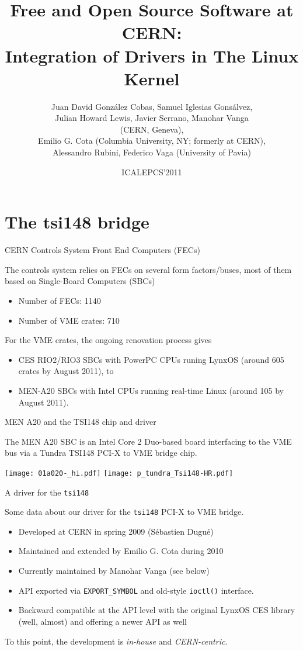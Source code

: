 \documentclass{beamer}
\title[FOSS at CERN: Drivers in the Kernel]%
	{Free and Open Source Software at CERN:\\
	Integration of Drivers in The Linux Kernel}
\author[David Cobas et al.]{%
	Juan David Gonz\'alez Cobas, Samuel Iglesias Gons\'alvez,\\
	Julian Howard Lewis, Javier Serrano, Manohar Vanga\\
		(CERN, Geneva),\\
	Emilio G. Cota (Columbia University, NY; formerly at CERN),\\
	Alessandro Rubini, Federico Vaga (University of Pavia)}
\date{ICALEPCS'2011}
\begin{document}
\begin{frame}
\titlepage
\end{frame}

\section{The tsi148 bridge}
\begin{frame}{CERN Controls System Front End Computers (FECs)}

The controls system relies on FECs on several form factors/buses,
most of them based on Single-Board Computers (SBCs)

\begin{itemize}
\item Number of FECs: 1140
\item Number of VME crates: 710
\end{itemize}

For the VME crates, the ongoing renovation process gives
\begin{itemize}
\item CES RIO2/RIO3 SBCs with PowerPC CPUs runing
LynxOS (around 605 crates by August 2011), to
\item MEN-A20 SBCs with Intel CPUs running real-time
Linux (around 105 by August 2011).
\end{itemize}
\end{frame}


\begin{frame}{MEN A20 and the TSI148 chip and driver}

The MEN A20 SBC is an Intel Core 2 Duo-based board interfacing to the
VME bus via a Tundra TSI148 PCI-X to VME bridge chip.

\begin{center}
\texttt{[image: 01a020-\_hi.pdf]} \qquad
\texttt{[image: p\_tundra\_Tsi148-HR.pdf]}
\end{center}
\end{frame}

\begin{frame}{A driver for the \texttt{tsi148}}

Some data about our driver for the \texttt{tsi148} PCI-X to VME bridge.
\begin{itemize}
\item Developed at CERN in spring 2009 (S\'ebastien Dugu\'e)
\item Maintained and extended by Emilio G. Cota during 2010
\item Currently maintained by Manohar Vanga (see below)
\item API exported via \texttt{EXPORT\_SYMBOL} and old-style \texttt{ioctl()}
    interface.
\item Backward compatible at the API level with the original LynxOS CES
    library (well, almost) and offering a newer API as well
\end{itemize}

To this point, the development is \emph{in-house} and
\emph{CERN-centric}.
\end{frame}
\end{document}
